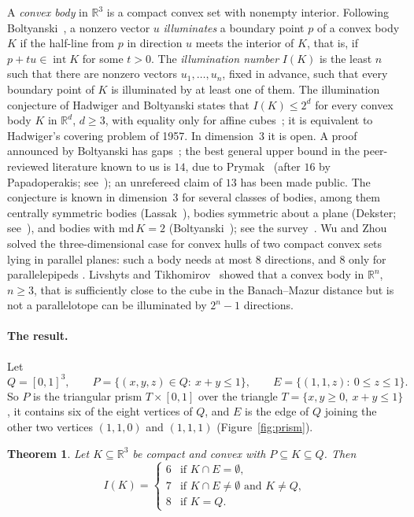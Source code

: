 \documentclass[11pt]{article}
\newtheorem{theorem}{Theorem}
\theoremstyle{definition}
\theoremstyle{remark}
\newcommand{\R}{\mathbb R}
\newcommand{\inter}{\operatorname{int}}
\begin{document}
A \emph{convex body} in $\R^3$ is a compact convex set with nonempty interior.
Following Boltyanski~\cite{bk}, a nonzero vector $u$ \emph{illuminates} a
boundary point $p$ of a convex body $K$ if the half-line from $p$ in direction
$u$ meets the interior of $K$, that is, if $p+tu\in\inter K$ for some $t>0$.
The \emph{illumination number} $I(K)$ is the least $n$ such that there are
nonzero vectors $u_1,\dots,u_n$, fixed in advance, such that every boundary
point of $K$ is illuminated by at least one of them. The illumination
conjecture of Hadwiger and Boltyanski states that $I(K)\le2^d$ for every
convex body $K$ in $\R^d$, $d\ge3$, with equality only for affine
cubes~\cite[Conjecture~1.2]{bk}; it is equivalent to Hadwiger's covering
problem of 1957. In dimension~$3$ it is open. A proof announced by Boltyanski
has gaps~\cite[Section~2.1]{bk}; the best general upper bound in the
peer-reviewed literature known to us is $14$, due to Prymak~\cite{prymak}
(after $16$ by Papadoperakis; see~\cite{bk,prymak}); an unrefereed claim of
$13$ has been made public. The conjecture is known
in dimension~$3$ for several classes of bodies, among them centrally
symmetric bodies (Lassak~\cite{lassak}), bodies symmetric about a plane
(Dekster; see~\cite[Theorem~2.5]{bk}), and bodies with $\mathrm{md}\,K=2$
(Boltyanski~\cite{bol01}); see the survey~\cite{bk}. Wu and Zhou~\cite{wz} solved the three-dimensional case
for convex hulls of two compact convex sets lying in parallel planes: such a
body needs at most $8$ directions, and $8$ only for parallelepipeds
\cite[Theorem~3.13]{wz}. Livshyts and Tikhomirov~\cite[Theorem~1]{lt} showed
that a convex body in $\R^n$, $n\ge3$, that is sufficiently close to the cube
in the Banach--Mazur distance but is not a parallelotope can be illuminated by
$2^n-1$ directions.

\paragraph{The result.} Let
\[
Q=[0,1]^3,\qquad P=\{(x,y,z)\in Q:\ x+y\le1\},\qquad E=\{(1,1,z):\ 0\le z\le1\}.
\]
So $P$ is the triangular prism $T\times[0,1]$ over the triangle
$T=\{x,y\ge0,\ x+y\le1\}$, it contains six of the eight vertices of $Q$, and
$E$ is the edge of $Q$ joining the other two vertices $(1,1,0)$ and $(1,1,1)$
(Figure~\ref{fig:prism}).

\begin{theorem}\label{thm:main}
Let $K\subseteq\R^3$ be compact and convex with $P\subseteq K\subseteq Q$. Then
\[
I(K)=\begin{cases}
6 & \text{if } K\cap E=\emptyset,\\
7 & \text{if } K\cap E\ne\emptyset \text{ and } K\ne Q,\\
8 & \text{if } K=Q.
\end{cases}
\]
\end{theorem}
\end{document}
